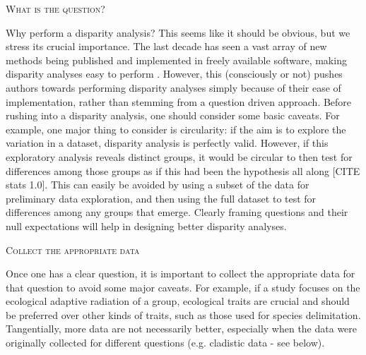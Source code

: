 \documentclass[12pt,letterpaper]{article}
\renewcommand{\section}[1]{%
\bigskip
\begin{center}
\begin{Large}
\normalfont\scshape #1
\medskip
\end{Large}
\end{center}}
\begin{document}
\section{What is the question?}
Why perform a disparity analysis?
This seems like it should be obvious, but we stress its crucial importance.
The last decade has seen a vast array of new methods being published and implemented in freely available software, making disparity analyses easy to perform \citep{bouxin2005ginkgo,oksanen2007vegan,geiger2008,zelditch2012geometric,adams2013geomorph,Claddis,dispRityv02,adams2017geometric}.
However, this (consciously or not) pushes authors towards performing disparity analyses simply because of their ease of implementation, rather than stemming from a question driven approach.
Before rushing into a disparity analysis, one should consider some basic caveats.
For example, one major thing to consider is circularity: if the aim is to explore the variation in a dataset, disparity analysis is perfectly valid.
However, if this exploratory analysis reveals distinct groups, it would be circular to then test for differences among those groups as if this had been the hypothesis all along [CITE stats 1.0].
This can easily be avoided by using a subset of the data for preliminary data exploration, and then using the full dataset to test for differences among any groups that emerge.
Clearly framing questions and their null expectations will help in designing better disparity analyses.

\section{Collect the appropriate data}
Once one has a clear question, it is important to collect the appropriate data for that question to avoid some major caveats.
For example, if a study focuses on the ecological adaptive radiation of a group, ecological traits are crucial and should be preferred over other kinds of traits, such as those used for species delimitation.
Tangentially, more data are not necessarily better, especially when the data were originally collected for different questions (e.g. cladistic data - see below).
\end{document}
